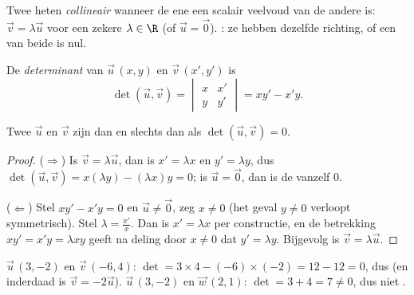 \begin{definition}\label{def:g11:vect:collinear}
Twee  heten \emph{collineair} wanneer de
ene een scalair veelvoud van de andere is: $\vec v = \lambda \vec u$ voor een
zekere $\lambda \in \R$ (of $\vec u = \vec 0$). : ze hebben
dezelfde richting, of een van beide is nul.
\end{definition}

\begin{definition}[Determinant]\label{def:g11:vect:det}
De \emph{determinant} van $\vec u\,(x, y)$ en
$\vec v\,(x', y')$ is
\[
\det(\vec u, \vec v) =
\begin{vmatrix} x & x' \\ y & y' \end{vmatrix}
= x y' - x' y .
\]
\end{definition}

\begin{theorem}\label{thm:g11:vect:collinearity}
Twee  $\vec u$ en $\vec v$ zijn  dan en slechts dan als
$\det(\vec u, \vec v) = 0$.
\end{theorem}

\begin{proof}
($\Rightarrow$) Is $\vec v = \lambda\vec u$, dan is $x' = \lambda x$ en
$y' = \lambda y$, dus $\det(\vec u, \vec v) = x(\lambda y) - (\lambda x)y
= 0$; is $\vec u = \vec 0$, dan is de  vanzelf $0$.

($\Leftarrow$) Stel $xy' - x'y = 0$ en $\vec u \neq \vec 0$, zeg $x \neq 0$
(het geval $y \neq 0$ verloopt symmetrisch). Stel $\lambda = \frac{x'}{x}$.
Dan is $x' = \lambda x$ per constructie, en de betrekking
$xy' = x'y = \lambda x y$ geeft na deling door $x \neq 0$ dat
$y' = \lambda y$. Bijgevolg is $\vec v = \lambda \vec u$.
\end{proof}

\begin{example}\label{ex:g11:vect:collinear}
$\vec u\,(3, -2)$ en $\vec v\,(-6, 4)$:
$\det = 3 \times 4 - (-6) \times (-2) = 12 - 12 = 0$, dus  (en
inderdaad is $\vec v = -2\vec u$). $\vec u\,(3, -2)$ en $\vec w\,(2, 1)$:
$\det = 3 + 4 = 7 \neq 0$, dus niet .
\end{example}


